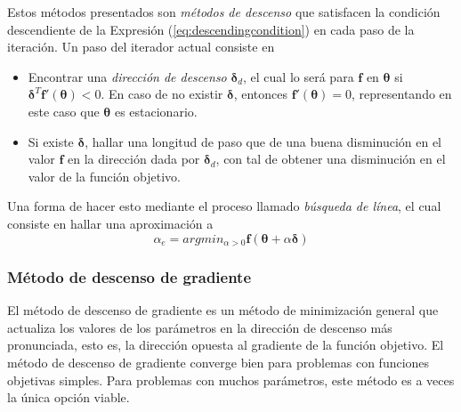 Estos métodos presentados son \textit{métodos de descenso} que satisfacen la condición descendiente de la Expresión (\ref{eq:descendingcondition}) en cada paso de la iteración. Un paso del iterador actual consiste en
\begin{itemize}
    \item Encontrar una \textit{dirección de descenso} $\bm{\delta}_d$, el cual lo será para $\bm{f}$ en $\bm{\theta}$ si $\bm{\delta}^T\bm{f}'(\bm{\theta}) < 0$. En caso de no existir $\bm{\delta}$, entonces $\bm{f}'(\bm{\theta}) = 0$, representando en este caso que $\bm{\theta}$ es estacionario.
    \item Si existe $\bm{\delta}$, hallar una longitud de paso que de una buena disminución en el valor $\bm{f}$ en la dirección dada por $\bm{\delta}_d$, con tal de obtener una disminución en el valor de la función objetivo.
\end{itemize}

Una forma de hacer esto mediante el proceso llamado \textit{búsqueda de línea}, el cual consiste en hallar una aproximación a
\begin{equation}
    \alpha_e = argmin_{\alpha > 0} \bm{f}(\bm{\theta}+\alpha \bm{\delta})
\end{equation}

\subsubsection{Método de descenso de gradiente}

El método de descenso de gradiente es un método de minimización general que actualiza los valores de los parámetros en la dirección de descenso más pronunciada, esto es, la dirección opuesta al gradiente de la función objetivo. El método de descenso de gradiente converge bien para problemas con funciones objetivas simples. Para problemas con muchos parámetros, este método es a veces la única opción viable.

